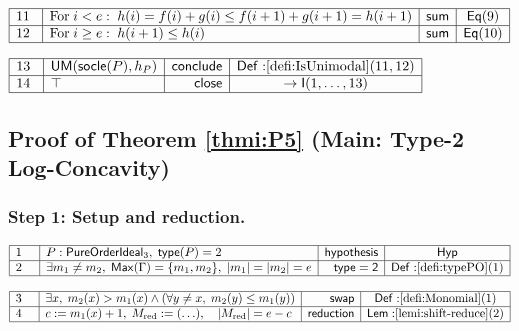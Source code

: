 \documentclass[11pt,reqno]{amsart}
\begin{document}
\nointerlineskip\noindent$%
\begin{array}{|m{0.5cm}|l|r|c|}
\hline
11 & \text{For}\;i<e:\;h(i)=f(i)+g(i)\le f(i+1)+g(i+1)=h(i+1) & \mathsf{sum}
& \mathsf{Eq}(9) \\ \hline
12 & \text{For}\;i\ge e:\;h(i+1)\le h(i) & \mathsf{sum} & \mathsf{Eq}(10) \\ 
\hline
\end{array}%
$

\nointerlineskip\noindent$%
\begin{array}{|m{0.5cm}|l|r|c|}
\hline
13 & \mathsf{UM}(\mathsf{socle}(P),h_{P}) & \mathsf{conclude} & \mathsf{Def:}%
\ref{defi:IsUnimodal}(11,12) \\ \hline
14 & \top & \mathsf{close} & \to\mathsf{I}(1,\dots,13) \\ \hline
\end{array}%
$

\medskip


\subsection*{Proof of Theorem \protect\ref{thmi:P5} (Main: Type-2
Log-Concavity)}


\subsubsection*{Step 1: Setup and reduction.}

\noindent$%
\begin{array}{|m{0.5cm}|l|r|c|}
\hline
1 & P:\mathsf{PureOrderIdeal}_{3},\;\mathsf{type}(P)=2 & \mathsf{hypothesis}
& \mathsf{Hyp} \\ \hline
2 & \exists m_{1}\ne m_{2},\;\mathsf{Max}(\Gamma)=\{m_{1},m_{2}\},%
\;|m_{1}|=|m_{2}|=e & \mathsf{type=2} & \mathsf{Def:}\ref{defi:typePO}(1) \\ 
\hline
\end{array}%
$

\nointerlineskip\noindent$%
\begin{array}{|m{0.5cm}|l|r|c|}
\hline
3 & \exists x,\;m_{2}(x)>m_{1}(x)\wedge(\forall y\ne x,\;m_{2}(y)\le
m_{1}(y)) & \mathsf{swap} & \mathsf{Def:}\ref{defi:Monomial}(1) \\ \hline
4 & c:=m_{1}(x)+1,\;M_{\mathrm{red}}:=(\ldots),\quad|M_{\mathrm{red}}|=e-c & 
\mathsf{reduction} & \mathsf{Lem:}\ref{lemi:shift-reduce}(2) \\ \hline
\end{array}%
$
\end{document}
